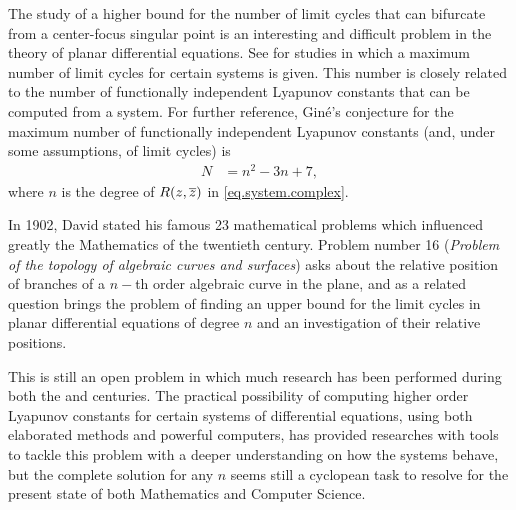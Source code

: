 The study of a higher bound for the number of limit cycles that can bifurcate from a center-focus singular point is an interesting and difficult problem in the theory of planar differential equations. See \textcite{Gine2007,Llibre2010} for studies in which a maximum number of limit cycles for certain systems is given. This number is closely related to the number of functionally independent Lyapunov constants that can be computed from a system. For further reference, Giné's conjecture for the maximum number of functionally independent Lyapunov constants (and, under some assumptions, of limit cycles) is
\begin{align}
N&=n^2-3n+7,
\label{eq.max-lyaps}
\end{align}
where $n$ is the degree of $R(z,\overline{z})$ in \eqref{eq.system.complex}.

In 1902, David \citeauthor{Hilbert1902} %
stated his famous 23 mathematical problems which influenced greatly the Mathematics of the twentieth century. Problem number 16 (\emph{Problem of the topology of algebraic curves and surfaces}) asks about the relative position of branches of a $n-$th order algebraic curve in the plane, and as a related question brings the problem of finding an upper bound for the limit cycles in planar differential equations of degree $n$ and an investigation of their relative positions.

This is still an open problem in which much research has been performed during both the  and  centuries. The practical possibility of computing higher order Lyapunov constants for certain systems of differential equations, using both elaborated methods and powerful computers, has provided researches with tools to tackle this problem with a deeper understanding on how the systems behave, but the complete solution for any $n$ seems still a cyclopean task to resolve for the present state of both Mathematics and Computer Science.


